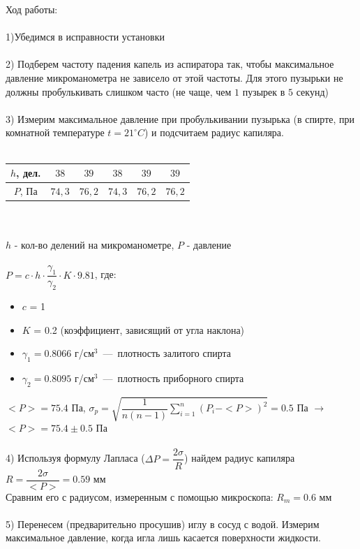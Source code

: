\documentclass[12pt,a4paper,fleqn]{article}
\begin{document}
    Ход работы:\\\\
    1)Убедимся в исправности установки\\\\
    2) Подберем частоту падения капель из аспиратора так, чтобы максимальное давление микроманометра не зависело от этой частоты. Для этого пузырьки не должны пробулькивать слишком часто (не чаще, чем $1$ пузырек в $5$ секунд)\\\\
    3) Измерим максимальное давление при пробулькивании пузырька (в спирте, при комнатной температуре $t = 21^{\circ}C$) и подсчитаем радиус капиляра. \\\\
    \begin{tabular}{c | c | c | c | c | c}
        $h$, дел. & $38$ & $39$ & $38$ & $39$ & $39$ \\ \hline
        $P$, Па & $74,3$ & $76,2$ & $74,3$ & $76,2$ & $76,2$ \\ 
    \end{tabular} \\\\
    $h$ - кол-во делений на микроманометре, $P$ - давление \\\\
    $P = c \cdot h \cdot \dfrac{\gamma_1}{\gamma_2} \cdot K \cdot 9.81$, где:\\
    \begin{itemize}
        \item $c$ = 1
        \item $K$ = 0.2 (коэффициент, зависящий от угла наклона)
        \item $\gamma_1 = 0.8066$ г/см$^3$~---~плотность залитого спирта
        \item $\gamma_2 = 0.8095$ г/см$^3$~---~плотность приборного спирта
    \end{itemize}
    $<P> = 75.4$ Па, $\sigma_p = \sqrt{\dfrac{1}{n(n-1)} \sum_{i=1}^n (P_i - <P>)^2} = 0.5$ Па $\rightarrow$ $<P> = 75.4 \pm 0.5$ Па \\\\
    4) Используя формулу Лапласа ($\Delta P = \dfrac{2 \sigma}{R}$) найдем радиус капиляра $R = \dfrac{2 \sigma}{<P>} = 0.59$ мм \\
    Сравним его с радиусом, измеренным с помощью микроскопа: $R_m = 0.6$ мм \\\\
    5) Перенесем (предварительно просушив) иглу в сосуд с водой. Измерим максимальное давление, когда игла лишь касается поверхности жидкости. \\\\
\end{document}
